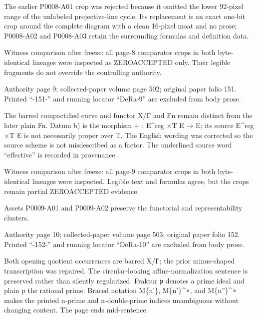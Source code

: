 \documentclass[11pt,a4paper]{article}
\begin{document}
The earlier P0008-A01 crop was rejected because it omitted the lower 92-pixel range of the unlabeled projective-line cycle. Its replacement is an exact one-bit crop around the complete diagram with a clean 16-pixel moat and no prose; P0008-A02 and P0008-A03 retain the surrounding formulas and definition data.

Witness comparison after freeze: all page-8 comparator crops in both byte-identical lineages were inspected as ZERO\textunderscore{}ACCEPTED only. Their legible fragments do not override the controlling authority.


\par\medskip
\hypertarget{D018-P0009}{}
\par\smallskip
Authority page 9; collected-paper volume page 502; original paper folio 151. Printed “-151-” and running locator “DeRa-9” are excluded from body prose.

The barred compactified curve and functor X/Γ̄ and F̄\textunderscore{}n remain distinct from the later plain F\textunderscore{}n. Datum b) is the morphism + : E\textasciicircum{}reg ×\textunderscore{}T E → E; its source E\textasciicircum{}reg ×\textunderscore{}T E is not necessarily proper over T. The English wording was corrected so the source scheme is not misdescribed as a factor. The underlined source word “effective” is recorded in provenance.

Witness comparison after freeze: all page-9 comparator crops in both byte-identical lineages were inspected. Legible text and formulas agree, but the crops remain partial ZERO\textunderscore{}ACCEPTED evidence.

Assets P0009-A01 and P0009-A02 preserve the functorial and representability clusters.


\par\medskip
\hypertarget{D018-P0010}{}
\par\smallskip
Authority page 10; collected-paper volume page 503; original paper folio 152. Printed “-152-” and running locator “DeRa-10” are excluded from body prose.

Both opening quotient occurrences are barred X/Γ̄; the prior minus-shaped transcription was repaired. The circular-looking affine-normalization sentence is preserved rather than silently regularized. Fraktur \ensuremath{\mathfrak{p}} denotes a prime ideal and plain p the rational prime. Braced notation M\textunderscore{}\{n'\}, M\textunderscore{}\{n'\}\textasciicircum{}∘, and M\textunderscore{}\{n''\}\textasciicircum{}∘ makes the printed n-prime and n-double-prime indices unambiguous without changing content. The page ends mid-sentence.
\end{document}
